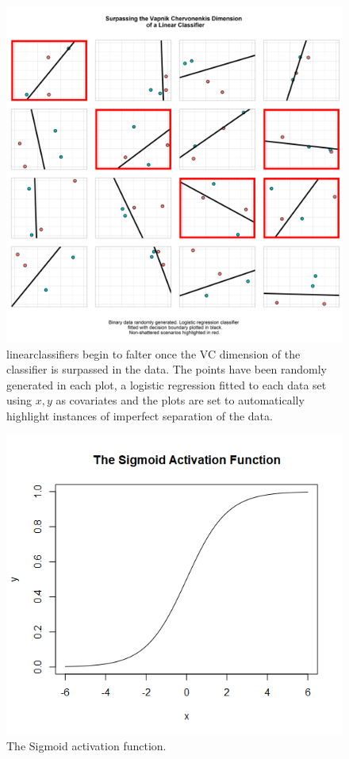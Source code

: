 \begin{figure}[H]
    \centering
    \includegraphics[width=120mm]{figs/vc_4.png}
    \caption[Surpassing the \gls{vc} dimension of a linear classifier - the data is not always shattered.]{\Gls{linearclassifier}s begin to falter once the VC dimension of the classifier is surpassed in the data. The points have been randomly generated in each plot, a logistic regression fitted to each data set using $x, y$ as covariates and the plots are set to automatically highlight instances of imperfect separation of the data.}
    \label{fig:vc_4}
\end{figure}

\begin{figure}
    \includegraphics[scale=0.5]{figs/sigmoid.png}
    \caption{The Sigmoid activation function.}
    \label{fig:sigmoid_function}
\end{figure}

